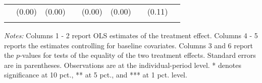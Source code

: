 \begin{table}[htbp]
{\begin{threeparttable}
\begin{tabular}{l*{8}{c}}
          &   (0.00)&   (0.00)&         &   (0.00)&   (0.00)&         &   (0.11)&         \\
          &         &         &         &         &         &         &         &         \\
\bottomrule \end{tabular} \begin{tablenotes}[flushleft] \footnotesize \item \emph{Notes:} Columns 1 - 2 report OLS estimates of the treatment effect. Columns 4 - 5 reports the estimates controlling for baseline covariates. Columns 3 and 6 report the \(p\)-values for tests of the equality of the two treatment effects. Standard errors are in parentheses. Observations are at the individual-period level. * denotes significance at 10 pct., ** at 5 pct., and *** at 1 pct. level. \end{tablenotes} \end{threeparttable} } \end{table}

